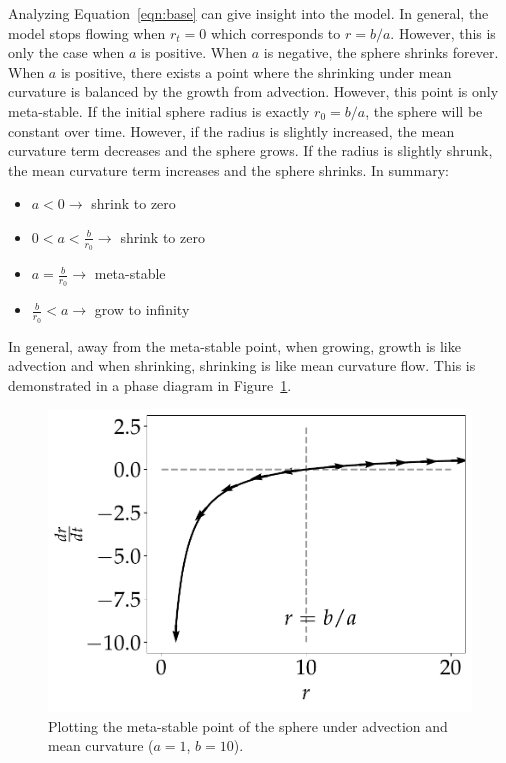 \documentclass[journal]{IEEEtran}
\begin{document}
Analyzing Equation~\ref{eqn:base} can give insight into the model.
In general, the model stops flowing when $r_t = 0$ which corresponds to $r = b/a$.
However, this is only the case when $a$ is positive.
When $a$ is negative, the sphere shrinks forever.
When $a$ is positive, there exists a point where the shrinking under mean curvature is balanced by the growth from advection.
However, this point is only meta-stable.
If the initial sphere radius is exactly $r_0 = b/a$, the sphere will be constant over time.
However, if the radius is slightly increased, the mean curvature term decreases and the sphere grows.
If the radius is slightly shrunk, the mean curvature term increases and the sphere shrinks.
In summary:
\begin{itemize}
  \item $a < 0 \rightarrow$ shrink to zero
  \item $0 < a < \frac{b}{r_0} \rightarrow $ shrink to zero
  \item $ a = \frac{b}{r_0} \rightarrow $ meta-stable
  \item $\frac{b}{r_0} < a \rightarrow $ grow to infinity
\end{itemize}
In general, away from the meta-stable point, when growing, growth is like advection and when shrinking, shrinking is like mean curvature flow.
This is demonstrated in a phase diagram in Figure~\ref{fig:loss}.

\begin{figure}[b]
  \centering
    \includegraphics[width=0.9\linewidth]{loss}%
  \caption{Plotting the meta-stable point of the sphere under advection and mean curvature ($a = 1$, $b = 10$).}
  \label{fig:loss}
\end{figure}
\end{document}

